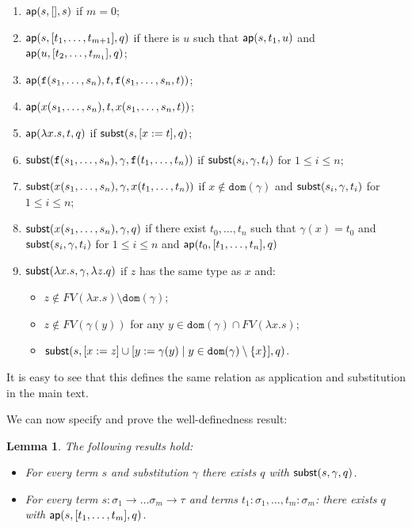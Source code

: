 \documentclass{lmcs}
\theoremstyle{theorem}\newtheorem{theorem}[dummy]{Theorem}
\theoremstyle{theorem}\newtheorem{lemma}[dummy]{Lemma}
\theoremstyle{theorem}\newtheorem{corollary}[dummy]{Corollary}
\theoremstyle{definition}\newtheorem{definition}[dummy]{Definition}
\theoremstyle{definition}\newtheorem{example}[dummy]{Example}
\newcommand{\FV}{\mathit{FV}}
\newcommand{\domain}{\mathtt{dom}}
\newcommand{\atype}{\sigma}
\newcommand{\btype}{\tau}
\newcommand{\identifier}[1]{\mathtt{#1}}
\newcommand{\afun}{\identifier{f}}
\newcommand{\avar}{x}
\newcommand{\bvar}{y}
\newcommand{\cvar}{z}
\newcommand{\abs}[2]{\lambda #1.#2}
\newcommand{\arrtype}{\rightarrow}
\begin{document}
\begin{enumerate}
\item $\mathsf{ap}(s, [], s)$ if $m = 0$;
\item\label{ap:combi} $\mathsf{ap}(s, [t_1,\dots,t_{m+1}], q)$ if there is $u$ such that $\mathsf{ap}(s,t_1,u)$ and $\mathsf{ap}(u, [t_2,\dots,t_{m_1}], q)$;
\item $\aprel{\afun(s_1,\dots,s_n),t,\afun(s_1,\dots,s_n,t)}$;
\item $\aprel{\avar(s_1,\dots,s_n),t,\avar(s_1,\dots,s_n,t)}$;
\item\label{ap:abs} $\aprel{\abs{\avar}{s},t,q}$ if $\subrel{s,[\avar:=t],q}$;
\item\label{subst:func} $\subrel{\afun(s_1,\dots,s_n),\gamma,\afun(t_1,\dots,t_n)}$ if $\mathsf{subst}(s_i,\gamma,t_i)$ for $1 \leq i \leq n$;
\item\label{subst:safevar} $\subrel{\avar(s_1,\dots,s_n),\gamma,\avar(t_1,\dots,t_n)}$ if $x \notin \domain(\gamma)$ and $\mathsf{subst}(s_i,\gamma,t_i)$ for $1 \leq i \leq n$;
\item\label{subst:appvar} $\subrel{\avar(s_1,\dots,s_n),\gamma,q}$ if there exist $t_0,\dots,t_n$ such that $\gamma(x) = t_0$ and $\mathsf{subst}(s_i,\gamma,t_i)$ for
  $1 \leq i \leq n$ and $\mathsf{ap}(t_0,[t_1,\dots,t_n],q)$
\item\label{subst:abs} $\subrel{\abs{\avar}{s},\gamma,\abs{\cvar}{q}}$ if $\cvar$ has the same type as $\avar$ and:
  \begin{itemize}
  \item $\cvar \notin \FV(\abs{\avar}{s}) \setminus \domain(\gamma)$;
  \item $\cvar \notin \FV(\gamma(y))$ for any $y \in \domain(\gamma) \cap \FV(\abs{\avar}{s})$;
  \item $\subrel{s,[\avar:=\cvar] \cup [\bvar := \gamma(\bvar) \mid \bvar \in \domain(\gamma) \setminus \{\avar\}],q}$.
  \end{itemize}
\end{enumerate}
It is easy to see that this defines the same relation as application and substitution in the main text.

We can now specify and prove the well-definedness result:

\begin{lemma}\label{lem:substdefined}
The following results hold:
\begin{itemize}
\item For every term $s$ and substitution $\gamma$ there exists $q$ with $\mathsf{subst}(s,\gamma,q)$. %
\item For every term $s : \atype_1 \arrtype \dots \atype_m \arrtype \btype$ and terms
  $t_1 : \atype_1,\dots,t_m : \atype_m$: there exists $q$ with $\mathsf{ap}(s, [t_1,\dots,t_m], q)$. %
\end{itemize}
\end{lemma}
\end{document}
